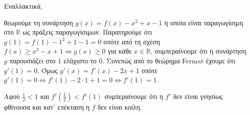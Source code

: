 \begin{alist}
\begin{rlist}
            Εναλλακτικά,

            θεωρούμε τη συνάρτηση $g(x) = f(x)-x^2+x-1$ η οποία είναι παραγωγίσιμη στο $\mathbb{R}$ ως πράξεις παραγωγίσιμων. Παρατηρούμε ότι $g(1) = f(1)-1^2+1-1 = 0$ οπότε από τη σχέση $f(x) \geq x^2-x+1 \Leftrightarrow g(x) \geq 0$ για κάθε $x \in \mathbb{R}$, συμπεραίνουμε ότι η συνάρτηση $g$ παρουσιάζει στο $1$ ελάχιστο το $0$. Συνεπώς από το θεώρημα Fermat έχουμε ότι $g'(1)=0$. Όμως $g'(x) = f'(x)-2x+1$ οπότε $g'(1)=0 \Leftrightarrow f'(1)-2\cdot 1+1=0 \Leftrightarrow f'(1)=1$.

            Αφού $\frac{1}{2} < 1$ και $f'\left(\frac{1}{2}\right) < f'(1)$ συμπεραίνουμε ότι η $f'$ δεν είναι γνησίως φθίνουσα και κατ' επέκταση η $f$ δεν είναι κοίλη.
        \end{rlist}
\end{alist}